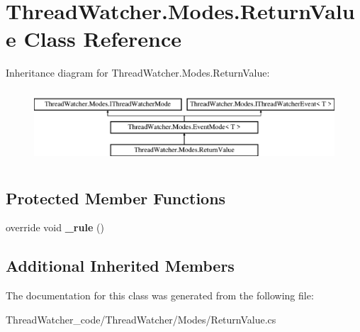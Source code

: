\hypertarget{class_thread_watcher_1_1_modes_1_1_return_value}{\section{Thread\+Watcher.\+Modes.\+Return\+Value Class Reference}
\label{class_thread_watcher_1_1_modes_1_1_return_value}
}
Inheritance diagram for Thread\+Watcher.\+Modes.\+Return\+Value\+:\begin{figure}[H]
\begin{center}
\leavevmode
\includegraphics[height=2.745098cm]{class_thread_watcher_1_1_modes_1_1_return_value}
\end{center}
\end{figure}
\subsection*{Protected Member Functions}
\begin{DoxyCompactItemize}
\item 
\hypertarget{class_thread_watcher_1_1_modes_1_1_return_value_af581bd29680dfce9818665f6fad1d1a2}{override void {\bfseries \+\_\+rule} ()}\label{class_thread_watcher_1_1_modes_1_1_return_value_af581bd29680dfce9818665f6fad1d1a2}

\end{DoxyCompactItemize}
\subsection*{Additional Inherited Members}


The documentation for this class was generated from the following file\+:\begin{DoxyCompactItemize}
\item 
Thread\+Watcher\+\_\+code/\+Thread\+Watcher/\+Modes/Return\+Value.\+cs\end{DoxyCompactItemize}
